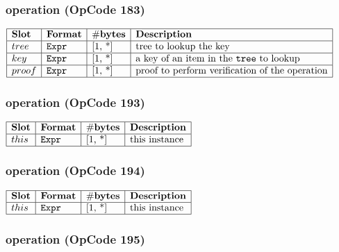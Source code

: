 \subsubsection{ operation (OpCode 183)}

\noindent
\(\begin{array}{| l | l | l | l |}
    \hline
    \bf{Slot} & \bf{Format} & \bf{\#bytes} & \bf{Description} \\
    \hline
         tree & \lst{Expr} & \text{[1, *]} & \text{tree to lookup the key} \\
    \hline
           key & \lst{Expr} & \text{[1, *]} & \text{a key of an item in the \lst{tree} to lookup} \\
    \hline
           proof & \lst{Expr} & \text{[1, *]} & \text{proof to perform verification of the operation} \\
    \hline
      
\end{array}\)
       

\subsubsection{ operation (OpCode 193)}

\noindent
\(\begin{array}{| l | l | l | l |}
    \hline
    \bf{Slot} & \bf{Format} & \bf{\#bytes} & \bf{Description} \\
    \hline
         this & \lst{Expr} & \text{[1, *]} & \text{this instance} \\
    \hline
      
\end{array}\)
       

\subsubsection{ operation (OpCode 194)}

\noindent
\(\begin{array}{| l | l | l | l |}
    \hline
    \bf{Slot} & \bf{Format} & \bf{\#bytes} & \bf{Description} \\
    \hline
         this & \lst{Expr} & \text{[1, *]} & \text{this instance} \\
    \hline
      
\end{array}\)
       

\subsubsection{ operation (OpCode 195)}

